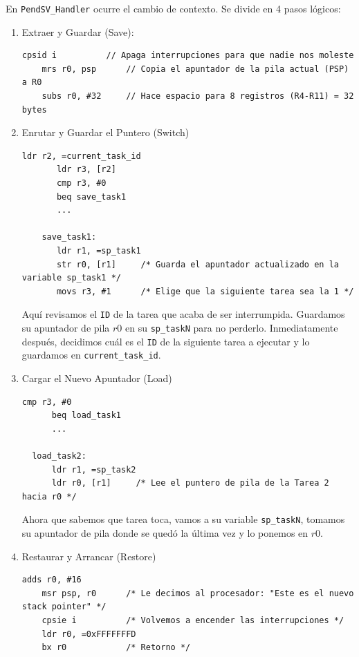 \documentclass[12pt,letterpaper]{article}
\begin{document}
\noindent
En \texttt{PendSV\_Handler} ocurre el cambio de contexto. Se divide en 4 pasos lógicos:

\begin{enumerate}
\item Extraer y Guardar (Save):
  \begin{lstlisting}[style=modernc]
    cpsid i          // Apaga interrupciones para que nadie nos moleste
    mrs r0, psp      // Copia el apuntador de la pila actual (PSP) a R0
    subs r0, #32     // Hace espacio para 8 registros (R4-R11) = 32 bytes
  \end{lstlisting}

\item Enrutar y Guardar el Puntero (Switch)

  \begin{lstlisting}[style=modernc]
       ldr r2, =current_task_id
       ldr r3, [r2] 
       cmp r3, #0
       beq save_task1
       ...
    
    save_task1:
       ldr r1, =sp_task1
       str r0, [r1]     /* Guarda el apuntador actualizado en la variable sp_task1 */
       movs r3, #1      /* Elige que la siguiente tarea sea la 1 */
  \end{lstlisting}
  
  Aquí revisamos el \texttt{ID} de la tarea que acaba de ser interrumpida. Guardamos su apuntador de pila $r0$ en su \texttt{sp\_taskN} para no perderlo. Inmediatamente después, decidimos cuál es el \texttt{ID} de la siguiente tarea a ejecutar y lo guardamos en \texttt{current\_task\_id}.

\item Cargar el Nuevo Apuntador (Load)

  \begin{lstlisting}[style=modernc]
      cmp r3, #0
      beq load_task1
      ...
    
  load_task2:
      ldr r1, =sp_task2
      ldr r0, [r1]     /* Lee el puntero de pila de la Tarea 2 hacia r0 */
  \end{lstlisting}

Ahora que sabemos que tarea toca, vamos a su variable \texttt{sp\_taskN}, tomamos su apuntador de pila donde se quedó la última vez y lo ponemos en $r0$.

\item Restaurar y Arrancar (Restore)

  \begin{lstlisting}[style=modernc]
    adds r0, #16
    msr psp, r0      /* Le decimos al procesador: "Este es el nuevo stack pointer" */
    cpsie i          /* Volvemos a encender las interrupciones */
    ldr r0, =0xFFFFFFFD
    bx r0            /* Retorno */
  \end{lstlisting}
\end{enumerate}
\end{document}
